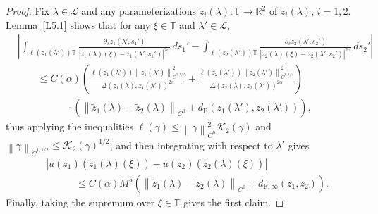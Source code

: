 \documentclass[reqno,centertags,12pt]{amsart}
\theoremstyle{definition}
\numberwithin{equation}{section}
\newcommand{\abs}[1]{\left\lvert#1\right\rvert}
\newcommand{\norm}[1]{\left\|#1\right\|}
\newcommand{\bbR}{{\mathbb{R}}}
\newcommand{\bbT}{{\mathbb{T}}}
\begin{document}
\begin{proof}
    Fix $\lambda\in\mathcal{L}$ and any parameterizations
    $\tilde{z}_{i}(\lambda)\colon\bbT\to\bbR^{2}$ of $z_{i}(\lambda)$, $i=1,2$.
    Lemma~\ref{L5.1}
    shows that for any $\xi\in\bbT$ and $\lambda'\in\mathcal{L}$,
    \begin{align*}
        &\abs{
            \int_{\ell(z_{1}(\lambda'))\bbT}
            \frac{\partial_{s}z_{1}(\lambda',s_{1}')}
            {\abs{\tilde{z}_{1}(\lambda)(\xi) - z_{1}(\lambda',s_{1}')}^{2\alpha}}
            \,ds_{1}'
            - \int_{\ell(z_{2}(\lambda'))\bbT}
            \frac{\partial_{s}z_{2}(\lambda',s_{2}')}
            {\abs{\tilde{z}_{2}(\lambda)(\xi) - z_{2}(\lambda',s_{2}')}^{2\alpha}}
            \,ds_{2}'
        } \\
        &\quad\quad \leq
        C(\alpha)\left(
            \frac{\ell(z_{1}(\lambda'))
            \norm{z_{1}(\lambda')}_{\dot{C}^{1,1/2}}^{2}}
            {\Delta(z_{1}(\lambda),z_{1}(\lambda'))^{2\alpha}}
            + \frac{\ell(z_{2}(\lambda'))
            \norm{z_{2}(\lambda')}_{\dot{C}^{1,1/2}}^{2}}
            {\Delta(z_{2}(\lambda),z_{2}(\lambda'))^{2\alpha}}
        \right) \\
        &\quad\quad\quad\quad\quad \cdot
        \left(
            \norm{\tilde{z}_{1}(\lambda)-\tilde{z}_{2}(\lambda)}_{C^{0}}
            + d_{\mathrm{F}}(z_{1}(\lambda'),z_{2}(\lambda'))
        \right),
    \end{align*}
    thus applying the inequalities
    $\ell(\gamma) \leq \norm{\gamma}_{C^{0}}^{2}\mathcal{K}_{2}(\gamma)$
    and $\norm{\gamma}_{\dot{C}^{1,1/2}} \leq \mathcal{K}_{2}(\gamma)^{1/2}$,
    and then integrating with respect to $\lambda'$ gives
    \begin{align*}
        &\abs{u(z_{1})(\tilde{z}_{1}(\lambda)(\xi))
        - u(z_{2})(\tilde{z}_{2}(\lambda)(\xi))}
        \\&\quad\quad\quad \leq
        C(\alpha)M^{5} \left(
            \norm{\tilde{z}_{1}(\lambda)-\tilde{z}_{2}(\lambda)}_{C^{0}}
            + d_{\mathrm{F},\infty}(z_{1},z_{2})
        \right).
    \end{align*}
    Finally, taking the supremum over $\xi\in\bbT$ gives the first claim.
    

\end{proof}
\end{document}

